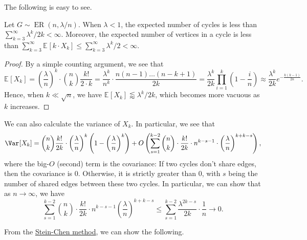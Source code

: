 The following is easy to see.

\begin{lemma}\label{lma:Erdős-Rényi-cycle-counting-mean}
	Let \(G \sim \operatorname{ER}(n, \lambda / n) \). When \(\lambda < 1\), the expected number of cycles is less than \(\sum_{k=3}^{\infty} \lambda ^k / 2k < \infty \). Moreover, the expected number of vertices in a cycle is less than \(\sum_{k=3}^{\infty} \mathbb{E}_{}[k \cdot X_k] \leq \sum_{k=3}^{\infty} \lambda ^k / 2 < \infty \).
\end{lemma}
\begin{proof}
	By a simple counting argument, we see that
	\[
		\mathbb{E}_{}[X_k]
		= \left( \frac{\lambda}{n} \right) ^k \cdot \binom{n}{k} \frac{k!}{2 \cdot k}
		= \frac{\lambda ^k}{n^k} \cdot \frac{n(n-1) \dots (n-k+1)}{2k}
		= \frac{\lambda ^k}{2k} \prod_{i=1}^{k} \left( 1 - \frac{i}{n} \right)
		\approx \frac{\lambda ^k}{2k} e^{- \frac{k (k-1)}{2n}}.
	\]
	Hence, when \(k \ll \sqrt{n} \), we have \(\mathbb{E}_{}[X_k] \lessapprox \lambda ^k / 2k\), which becomes more vacuous as \(k\) increases.
\end{proof}

We can also calculate the variance of \(X_k\). In particular, we see that
\begin{equation}\label{lma:Erdős-Rényi-cycle-counting-variance}
	\Var_{}[X_k]
	= \binom{n}{k} \frac{k!}{2k} \cdot \left( \frac{\lambda}{n} \right) ^k \left( 1 - \left( \frac{\lambda}{n} \right) ^k \right) + O\left( \sum_{s=1}^{k-2} \binom{n}{k} \cdot \frac{k!}{2k} \cdot n^{k - s - 1} \cdot \left( \frac{\lambda}{n} \right)^{k + k - s} \right),
\end{equation}
where the big-\(O\) (second) term is the covariance: If two cycles don't share edges, then the covariance is \(0\). Otherwise, it is strictly greater than \(0\), with \(s\) being the number of shared edges between these two cycles. In particular, we can show that as \(n \to \infty \), we have
\[
	\sum_{s=1}^{k-2} \binom{n}{k} \cdot \frac{k!}{2k} \cdot n^{k - s - 1} \left( \frac{\lambda }{n} \right) ^{k + k - s}
	\leq \sum_{s=1}^{k-2} \frac{\lambda ^{2k - s}}{2k} \cdot \frac{1}{n} \to 0.
\]

From the \hyperref[thm:Stein-Chen-method]{Stein-Chen method}, we can show the following.


